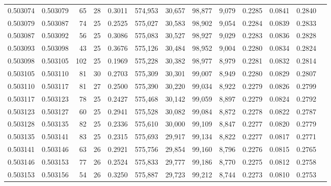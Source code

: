 \begin{tabular}{rrrrrrrrrrrrr}
0.503074 & 0.503079 &  65 &  28 &                                     0.3011 & 574,953 &  30,657 &  98,877 &   9,079 & 0.2285 & 0.0841 & 0.2840 \\
0.503079 & 0.503087 &  74 &  25 &                                     0.2525 & 575,027 &  30,583 &  98,902 &   9,054 & 0.2284 & 0.0839 & 0.2833 \\
0.503087 & 0.503092 &  56 &  25 &                                     0.3086 & 575,083 &  30,527 &  98,927 &   9,029 & 0.2283 & 0.0836 & 0.2828 \\
0.503093 & 0.503098 &  43 &  25 &                                     0.3676 & 575,126 &  30,484 &  98,952 &   9,004 & 0.2280 & 0.0834 & 0.2824 \\
0.503098 & 0.503105 & 102 &  25 &                                     0.1969 & 575,228 &  30,382 &  98,977 &   8,979 & 0.2281 & 0.0832 & 0.2814 \\
0.503105 & 0.503110 &  81 &  30 &                                     0.2703 & 575,309 &  30,301 &  99,007 &   8,949 & 0.2280 & 0.0829 & 0.2807 \\
0.503110 & 0.503117 &  81 &  27 &                                     0.2500 & 575,390 &  30,220 &  99,034 &   8,922 & 0.2279 & 0.0826 & 0.2799 \\
0.503117 & 0.503123 &  78 &  25 &                                     0.2427 & 575,468 &  30,142 &  99,059 &   8,897 & 0.2279 & 0.0824 & 0.2792 \\
0.503123 & 0.503127 &  60 &  25 &                                     0.2941 & 575,528 &  30,082 &  99,084 &   8,872 & 0.2278 & 0.0822 & 0.2787 \\
0.503128 & 0.503135 &  82 &  25 &                                     0.2336 & 575,610 &  30,000 &  99,109 &   8,847 & 0.2277 & 0.0820 & 0.2779 \\
0.503135 & 0.503141 &  83 &  25 &                                     0.2315 & 575,693 &  29,917 &  99,134 &   8,822 & 0.2277 & 0.0817 & 0.2771 \\
0.503141 & 0.503146 &  63 &  26 &                                     0.2921 & 575,756 &  29,854 &  99,160 &   8,796 & 0.2276 & 0.0815 & 0.2765 \\
0.503146 & 0.503153 &  77 &  26 &                                     0.2524 & 575,833 &  29,777 &  99,186 &   8,770 & 0.2275 & 0.0812 & 0.2758 \\
0.503153 & 0.503156 &  54 &  26 &                                     0.3250 & 575,887 &  29,723 &  99,212 &   8,744 & 0.2273 & 0.0810 & 0.2753 \\

\end{tabular}
